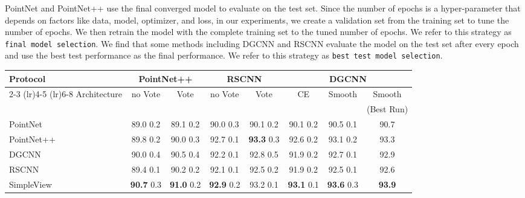 \documentclass{article}
\newcommand\method{SimpleView}
\newcommand{\smallsec}[1]{\noindent {\bf #1:}}
\begin{document}
\smallsec{Selecting Model for Testing} PointNet and PointNet++ use the final converged model to evaluate on the test set. Since the number of epochs is a hyper-parameter that depends on factors like data, model, optimizer, and loss, in our experiments, we create a validation set from the training set to tune the number of epochs. We then retrain the model with the complete training set to the tuned number of epochs. We refer to this strategy as \texttt{final model selection}. We find that some methods including DGCNN and RSCNN evaluate the model on the test set after every epoch and use the best test performance as the final performance. We refer to this strategy as \texttt{best test model selection}.
\begin{table*}[ht]
  \caption{Performance of various architectures on ModelNet40. Protocol affects performance by a large amount. \method{} performs on par or better than prior architectures across protocols.}
  \label{tab:perf_all}
  \centering
  \begin{tabular}{l@{\hskip 4mm}c@{\hskip 4mm}c@{\hskip 4mm}c@{\hskip 4mm}c@{\hskip 4mm}c@{\hskip 4mm}cc}
    \hline
     Protocol       &  \multicolumn{2}{c}{PointNet++}  & \multicolumn{2}{c}{RSCNN} & \multicolumn{3}{c}{DGCNN} \\

\cmidrule(lr){2-3}
\cmidrule(lr){4-5}
\cmidrule(lr){6-8}
    Architecture    &  no Vote    &  Vote    & no Vote &  Vote &  CE &  Smooth & Smooth \\
    & & & & & & &  (Best Run) \\ 
    \hline
    PointNet   & 89.0  0.2 & 89.1  0.2 & 90.0  0.3 & 90.1  0.2 & 90.1  0.2 & 90.5  0.1 & 90.7\\
    PointNet++ & 89.8  0.2 & 90.0  0.3 & 92.7  0.1 & \textbf{93.3}  0.3 & 92.6  0.2 & 93.1  0.2 & 93.3\\
    DGCNN      & 90.0  0.4 & 90.5  0.4 & 92.2  0.1 & 92.8  0.5 & 91.9  0.2 & 92.7  0.1 & 92.9\\
    RSCNN      & 89.4  0.1 & 90.2  0.2 & 92.1  0.1 & 92.5  0.2 & 91.9  0.2 & 92.5  0.1 & 92.6 \\
    \method{}    & \textbf{90.7}  0.3 & \textbf{91.0}  0.2 & \textbf{92.9}  0.2 & 93.2  0.1 & \textbf{93.1}  0.1 & \textbf{93.6}  0.3 & \textbf{93.9} \\
    \hline
  \end{tabular}
  \vspace{-2mm}
\end{table*}
\end{document}
